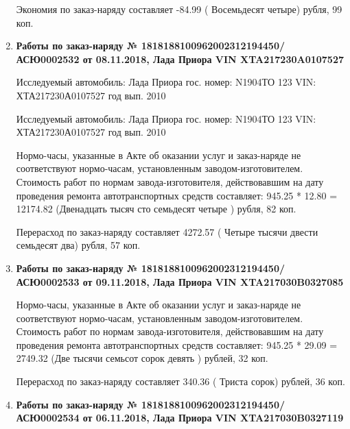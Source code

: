 \begin{enumerate}
Экономия по заказ-наряду составляет -84.99 ( Восемьдесят четыре) рубля, 99 коп.  
\vspace{3mm}




\item \par\textbf{{Работы по заказ-наряду № 1818188100962002312194450/\-АСЮ0002532 от 08.11.2018, Лада Приора  VIN XTA217230A0107527
}}


Исследуемый автомобиль:  Лада Приора гос. номер: N1904ТО 123 VIN: ХТА217230А0107527 год вып. 2010


Исследуемый автомобиль:  Лада Приора гос. номер: N1904ТО 123 VIN: ХТА217230А0107527 год вып. 2010




Нормо-часы, указанные в Акте об оказании услуг и заказ-наряде не соответствуют нормо-часам,  установленным заводом-изготовителем.\\
Стоимость работ по нормам завода-изготовителя, действовавшим на дату проведения ремонта автотранспортных средств составляет: 945.25 * 12.80 = 12174.82 (Двенадцать тысяч сто семьдесят четыре ) рубля, 82 коп.

Перерасход по заказ-наряду составляет 4272.57 ( Четыре тысячи двести семьдесят два) рубля, 57 коп.  
\vspace{3mm}



\item \par\textbf{{Работы по заказ-наряду  № 1818188100962002312194450/АСЮ0002533 от 09.11.2018, Лада Приора   VIN   XTA217030B0327085
}}




Нормо-часы, указанные в Акте об оказании услуг и заказ-наряде не соответствуют нормо-часам,  установленным заводом-изготовителем.\\
Стоимость работ по нормам завода-изготовителя, действовавшим на дату проведения ремонта автотранспортных средств составляет: 945.25 * 29.09 = 2749.32 (Две тысячи семьсот сорок девять ) рублей, 32 коп.

Перерасход по заказ-наряду составляет 340.36 ( Триста сорок) рублей, 36 коп.  
\vspace{3mm}





\item \par\textbf{{Работы по заказ-наряду № 1818188100962002312194450/\-АСЮ0002534 от 06.11.2018, Лада Приора   VIN XTA217030B0327119
}}



\end{enumerate}
